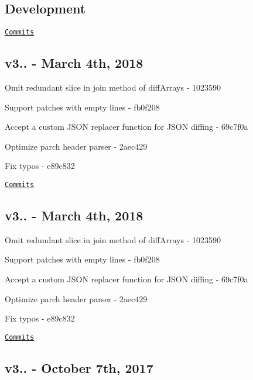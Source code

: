 \subsection*{Development}

\href{https://github.com/kpdecker/jsdiff/compare/v3.5.0...master}{\tt Commits}

\subsection*{v3.. -\/ March 4th, 2018}


\begin{DoxyItemize}
\item Omit redundant slice in join method of diff\+Arrays -\/ 1023590
\item Support patches with empty lines -\/ fb0f208
\item Accept a custom J\+S\+ON replacer function for J\+S\+ON diffing -\/ 69c7f0a
\item Optimize parch header parser -\/ 2aec429
\item Fix typos -\/ e89c832
\end{DoxyItemize}

\href{https://github.com/kpdecker/jsdiff/compare/v3.5.0...v3.5.0}{\tt Commits}

\subsection*{v3.. -\/ March 4th, 2018}


\begin{DoxyItemize}
\item Omit redundant slice in join method of diff\+Arrays -\/ 1023590
\item Support patches with empty lines -\/ fb0f208
\item Accept a custom J\+S\+ON replacer function for J\+S\+ON diffing -\/ 69c7f0a
\item Optimize parch header parser -\/ 2aec429
\item Fix typos -\/ e89c832
\end{DoxyItemize}

\href{https://github.com/kpdecker/jsdiff/compare/v3.4.0...v3.5.0}{\tt Commits}

\subsection*{v3.. -\/ October 7th, 2017}


